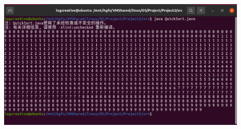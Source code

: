 \documentclass[12pt,a4paper]{article}
\newenvironment{problems}{\begin{list}{}{\renewcommand{\makelabel}[1]{\textbf{##1}\hfil}}}{\end{list}}
\providecommand{\code}[2]{}
\begin{document}
\begin{problems}
    \code{src/QuickSort.java}{java}

    \includegraphics[width=0.9\textwidth]{quicksort.png}

    \code{src/MergeSort.java}{java}

\end{problems}
\end{document}
